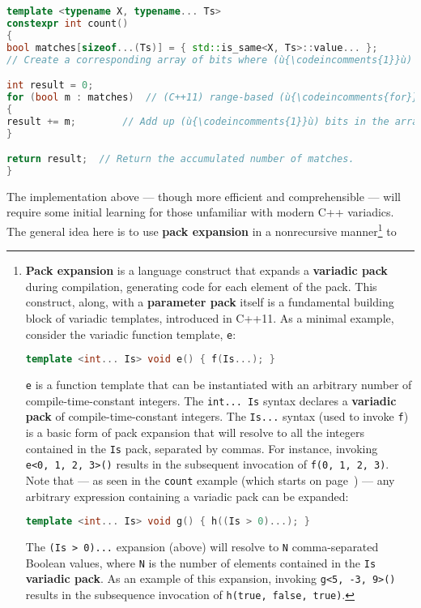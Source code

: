 \begin{lstlisting}[language=C++]
template <typename X, typename... Ts>
constexpr int count()
{
bool matches[sizeof...(Ts)] = { std::is_same<X, Ts>::value... };
// Create a corresponding array of bits where (ù{\codeincomments{1}}ù) indicates sameness.

int result = 0;
for (bool m : matches)  // (C++11) range-based (ù{\codeincomments{for}}ù) loop
{
result += m;        // Add up (ù{\codeincomments{1}}ù) bits in the array.
}

return result;  // Return the accumulated number of matches.
}
\end{lstlisting}

\noindent The implementation above --- though more efficient and comprehensible
--- will require some initial learning for those unfamiliar with modern
C++ variadics. The general idea here is to use \textbf{pack expansion}
in a nonrecursive manner{\cprotect\footnote{\textbf{Pack expansion} is
a language construct that expands a \textbf{variadic pack} during
compilation, generating code for each element of the pack. This
construct, along, with a \textbf{parameter pack} itself is a
fundamental building block of variadic templates,
introduced in C++11. As a minimal example, consider the variadic
function template, \texttt{e}:

\begin{lstlisting}[language=C++, basicstyle={\ttfamily\footnotesize}]
template <int... Is> void e() { f(Is...); }
\end{lstlisting}

\noindent \texttt{e} is a function template that can be instantiated
with an arbitrary number of compile-time-constant integers. The
\texttt{int...}~\texttt{Is} syntax declares a \textbf{variadic pack}
of compile-time-constant integers. The \texttt{Is...} syntax (used to
invoke \texttt{f}) is a basic form of pack expansion that will resolve
to all the integers contained in the \texttt{Is} pack, separated by
commas. For instance, invoking
\texttt{e<0,}~\texttt{1,}~\texttt{2,}~\texttt{3>()} results in the
subsequent invocation of
\texttt{f(0,}~\texttt{1,}~\texttt{2,}~\texttt{3)}. Note that --- as
seen in the \texttt{count} example (which starts on page~\pageref{relaxedconstexpr-countcode}) --- any arbitrary
expression containing a variadic pack can be expanded:

\begin{lstlisting}[language=C++, basicstyle={\ttfamily\footnotesize}]
template <int... Is> void g() { h((Is > 0)...); }
\end{lstlisting}

\noindent The \texttt{(Is}~\texttt{>}~\texttt{0)...} expansion (above) will
resolve to \texttt{N} comma-separated Boolean values, where \texttt{N}
is the number of elements contained in the \texttt{Is}
\textbf{variadic pack}. As an example of this expansion, invoking
\texttt{g<5,}~\texttt{-3,}~\texttt{9>()} results in the subsequence
invocation of \texttt{h(true,}~\texttt{false,}~\texttt{true)}.}} to

